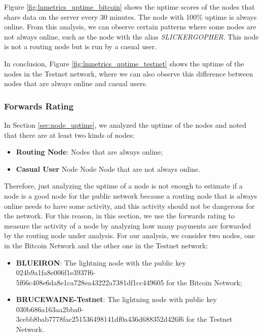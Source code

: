 Figure \ref{fig:lnmetrics_uptime_bitcoin} shows the uptime scores of the nodes that share data on 
the server every 30 minutes. The node with 100\% uptime is always online. From this analysis, we can 
observe certain patterns where some nodes are not always online, such as the node with the 
alias \emph{SLICKERGOPHER}. This node is not a routing node but is run by a casual user.

In conclusion, Figure \ref{fig:lnmetrics_uptime_testnet} shows the uptime of the nodes 
in the Testnet network, where we can also observe this difference between nodes that 
are always online and casual users.

\subsubsection{Forwards Rating}
\label{sec:forwards_rating}

In Section \ref{sec:node_uptime}, we analyzed the uptime of the nodes 
and noted that there are at least two kinds of nodes:

\begin{itemize}
    \item {\bf Routing Node}: Nodes that are always online;
    \item {\bf Casual User} Node Node Node that are not always online.
\end{itemize}

Therefore, just analyzing the uptime of a node is not enough to estimate if a node is a 
good node for the public network because a routing node that is always online needs to 
have some activity, and this activity should not be dangerous for the network.
For this reason, in this section, we use the forwards rating to measure the activity of 
a node by analyzing how many payments are forwarded by the routing node under analysis. 
For our analysis, we consider two nodes, one in the Bitcoin Network and the other 
one in the Testnet network:

\begin{itemize}
    \item {\bf BLUEIRON}: The lightning node with the public key 024b9a1fa8e006f1e3937f6-\\5f66c408e6da8e1ca728ea43222a7381df1cc449605 for the Bitcoin Network;
    \item {\bf BRUCEWAINE-Testnet}: The lightning node with public key 030b686a163aa2bba0-\\3cebb8bab7778fac251536498141df0a436d688352d426f6 for the Testnet Network.
\end{itemize}

